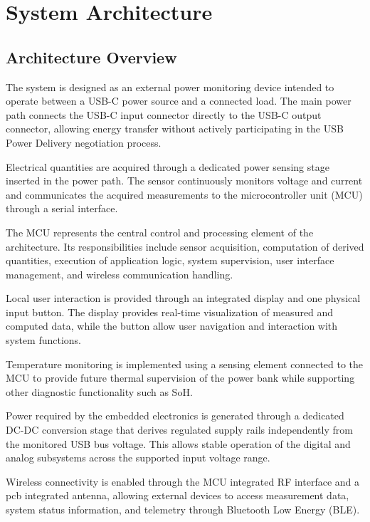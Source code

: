 \newpage
\section{System Architecture}

\subsection{Architecture Overview}

The system is designed as an external power monitoring device intended to operate between a USB-C power source and a connected load. The main power path connects the USB-C input connector directly to the USB-C output connector, allowing energy transfer without actively participating in the USB Power Delivery negotiation process.

Electrical quantities are acquired through a dedicated power sensing stage inserted in the power path. The sensor continuously monitors voltage and current and communicates the acquired measurements to the microcontroller unit (MCU) through a serial interface.

The MCU represents the central control and processing element of the architecture. Its responsibilities include sensor acquisition, computation of derived quantities, execution of application logic, system supervision, user interface management, and wireless communication handling.

Local user interaction is provided through an integrated display and one physical input button. The display provides real-time visualization of measured and computed data, while the button allow user navigation and interaction with system functions.

Temperature monitoring is implemented using a sensing element connected to the MCU to provide future thermal supervision of the power bank while supporting other diagnostic functionality such as SoH.

Power required by the embedded electronics is generated through a dedicated DC-DC conversion stage that derives regulated supply rails independently from the monitored USB bus voltage. This allows stable operation of the digital and analog subsystems across the supported input voltage range.

Wireless connectivity is enabled through the MCU integrated RF interface and a pcb integrated antenna, allowing external devices to access measurement data, system status information, and telemetry through Bluetooth Low Energy (BLE).

